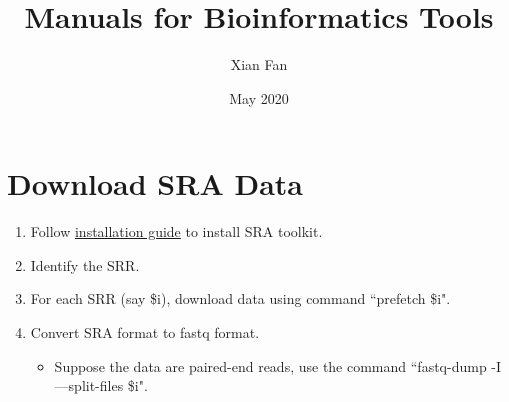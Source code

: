 \documentclass{article}
\title{Manuals for Bioinformatics Tools}
\author{Xian Fan}
\date{May 2020}
\begin{document}
\maketitle

\section{Download SRA Data}

\begin{enumerate}
    \item Follow \href{https://trace.ncbi.nlm.nih.gov/Traces/sra/sra.cgi?view=toolkit_doc}{installation guide} to install SRA toolkit. 
    \item Identify the SRR. 
    \item For each SRR (say \$i), download data using command ``prefetch \$i".
    \item Convert SRA format to fastq format. 
    \begin{itemize}
        \item Suppose the data are paired-end reads, use the command ``fastq-dump -I —split-files \$i". 
    \end{itemize}
\end{enumerate}
\end{document}
